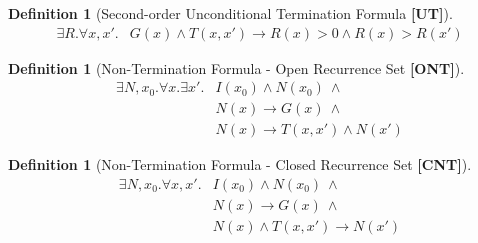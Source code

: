 \documentclass[preprint]{sigplanconf}
\theoremstyle{definition}
\newtheorem{definition}[theorem]{Definition}
\begin{document}
\begin{figure*}
\begin{framed}
\begin{definition}[Second-order Unconditional Termination Formula {\bf [UT]}]
\label{def:termination-formula}
\begin{align*}
 \exists R . \forall x, x' . & G(x) \wedge T(x, x') \rightarrow R(x) > 0 \wedge R(x) > R(x')
\end{align*}
\end{definition}

\begin{definition}[Non-Termination Formula - Open Recurrence Set  {\bf [ONT]}]
\label{def:nonterm-formula}
 \begin{align*}
  \exists N, x_0 . \forall x . \exists x' . & I(x_0) \wedge N(x_0) ~ \wedge \\
                                                        & N(x) \rightarrow G(x) ~ \wedge \\
							& N(x) \rightarrow T(x, x') \wedge N(x') 
 \end{align*}
\end{definition}

\begin{definition}[Non-Termination Formula - Closed Recurrence Set {\bf [CNT]}]
\label{def:deterministic-nonterm-formula}
 \begin{align*}
  \exists N, x_0 . \forall x, x' . & I(x_0) \wedge N(x_0) ~ \wedge \\
                                                        & N(x) \rightarrow G(x) ~ \wedge \\
							& N(x) \wedge T(x, x') \rightarrow N(x') 
 \end{align*}
\end{definition}

\end{framed}
\end{figure*}

\iffalse
Many loops do not terminate for all starting states, but are contained in programs that guarantee the loop will
terminate.  Traditional termination provers have difficulty reasoning about such conditionally-terminating loops.
We are able to handle such loops by computing \emph{termination invariants}.  This mechanism also allows us to
prove that programs with multiple loops terminate, even if the termination of some loop depends on the states
reachable after leaving a previous loop.

Our method for ranking function synthesis can be stated as follows:
discuss what spec is used (non-lexicographic vs lexicographic) + the completeness claims.
Any termination guarantees?  
\fi
\end{document}
